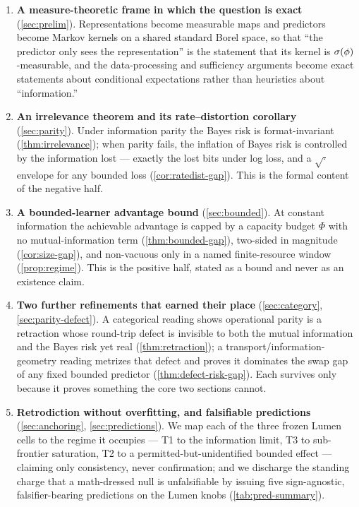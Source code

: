 \begin{enumerate}
  \item \textbf{A measure-theoretic frame in which the question is exact}
    (\cref{sec:prelim}). Representations become measurable maps and predictors
    become Markov kernels on a shared standard Borel space, so that ``the
    predictor only sees the representation'' is the statement that its kernel is
    $\sigma\!\left(\phi\right)$-measurable, and the data-processing and sufficiency arguments
    become exact statements about conditional expectations rather than heuristics
    about ``information.''
  \item \textbf{An irrelevance theorem and its rate--distortion corollary}
    (\cref{sec:parity}). Under information parity the Bayes risk is
    format-invariant (\cref{thm:irrelevance}); when parity fails, the inflation
    of Bayes risk is controlled by the information lost --- exactly the lost bits
    under log loss, and a $\sqrt{\cdot}$ envelope for any bounded loss
    (\cref{cor:ratedist-gap}). This is the formal content of the negative half.
  \item \textbf{A bounded-learner advantage bound} (\cref{sec:bounded}). At
    constant information the achievable advantage is capped by a capacity budget
    $\Phi$ with no mutual-information term (\cref{thm:bounded-gap}), two-sided in
    magnitude (\cref{cor:size-gap}), and non-vacuous only in a named
    finite-resource window (\cref{prop:regime}). This is the positive half,
    stated as a bound and never as an existence claim.
  \item \textbf{Two further refinements that earned their place}
    (\cref{sec:category}, \cref{sec:parity-defect}). A categorical reading shows
    operational parity is a retraction whose round-trip defect is invisible to
    both the mutual information and the Bayes risk yet real
    (\cref{thm:retraction}); a transport/information-geometry reading metrizes
    that defect and proves it dominates the swap gap of any fixed bounded
    predictor (\cref{thm:defect-risk-gap}). Each survives only because it proves
    something the core two sections cannot.
  \item \textbf{Retrodiction without overfitting, and falsifiable predictions}
    (\cref{sec:anchoring}, \cref{sec:predictions}). We map each of the three
    frozen Lumen cells to the regime it occupies --- T1 to the information limit,
    T3 to sub-frontier saturation, T2 to a permitted-but-unidentified bounded
    effect --- claiming only consistency, never confirmation; and we discharge
    the standing charge that a math-dressed null is unfalsifiable by issuing five
    sign-agnostic, falsifier-bearing predictions on the Lumen knobs
    (\cref{tab:pred-summary}).
\end{enumerate}


